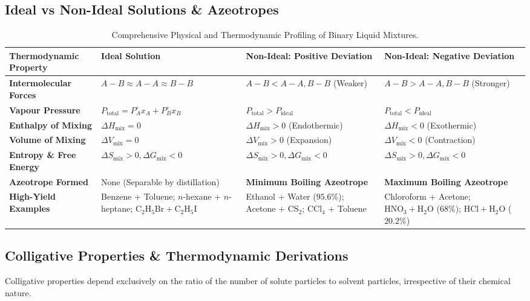 \documentclass[10pt,a4paper]{article}
\begin{document}
\subsection{Ideal vs Non-Ideal Solutions \& Azeotropes}
\begin{table}[htbp]
\centering
\small
\renewcommand{\arraystretch}{1.3}
\begin{tabularx}{\textwidth}{p{3.0cm} p{4.0cm} p{4.2cm} p{4.2cm}}
\toprule
\textbf{Thermodynamic Property} & \textbf{Ideal Solution} & \textbf{Non-Ideal: Positive Deviation} & \textbf{Non-Ideal: Negative Deviation} \\
\midrule
\textbf{Intermolecular Forces} & $A-B \approx A-A \approx B-B$ & $A-B < A-A, B-B$ (Weaker) & $A-B > A-A, B-B$ (Stronger) \\
\textbf{Vapour Pressure} & $P_{\text{total}} = P_A^\circ x_A + P_B^\circ x_B$ & $P_{\text{total}} > P_{\text{ideal}}$ & $P_{\text{total}} < P_{\text{ideal}}$ \\
\textbf{Enthalpy of Mixing} & $\Delta H_{\text{mix}} = 0$ & $\Delta H_{\text{mix}} > 0$ (Endothermic) & $\Delta H_{\text{mix}} < 0$ (Exothermic) \\
\textbf{Volume of Mixing} & $\Delta V_{\text{mix}} = 0$ & $\Delta V_{\text{mix}} > 0$ (Expansion) & $\Delta V_{\text{mix}} < 0$ (Contraction) \\
\textbf{Entropy \& Free Energy} & $\Delta S_{\text{mix}} > 0, \Delta G_{\text{mix}} < 0$ & $\Delta S_{\text{mix}} > 0, \Delta G_{\text{mix}} < 0$ & $\Delta S_{\text{mix}} > 0, \Delta G_{\text{mix}} < 0$ \\
\textbf{Azeotrope Formed} & None (Separable by distillation) & \textbf{Minimum Boiling Azeotrope} & \textbf{Maximum Boiling Azeotrope} \\
\textbf{High-Yield Examples} & Benzene + Toluene; $n$-hexane + $n$-heptane; $\mathrm{C_2H_5Br + C_2H_5I}$ & Ethanol + Water ($95.6\%$); Acetone + $\mathrm{CS_2}$; $\mathrm{CCl_4}$ + Toluene & Chloroform + Acetone; $\mathrm{HNO_3} + \mathrm{H_2O}$ ($68\%$); $\mathrm{HCl} + \mathrm{H_2O}$ ($20.2\%$) \\
\bottomrule
\end{tabularx}
\caption{Comprehensive Physical and Thermodynamic Profiling of Binary Liquid Mixtures.}
\end{table}

\subsection{Colligative Properties \& Thermodynamic Derivations}
Colligative properties depend exclusively on the ratio of the number of solute particles to solvent particles, irrespective of their chemical nature.
\end{document}
